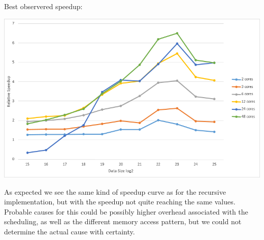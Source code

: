 \pagebreak
Best observered speedup:

\includegraphics[width=\textwidth]{omp_it_best.png}

As expected we see the same kind of speedup curve as for the recursive implementation, but with the speedup not quite reaching the same values. Probable causes for this could be possibly higher overhead associated with the scheduling, as well as the different memory access pattern,
but we could not determine the actual cause with certainty.
